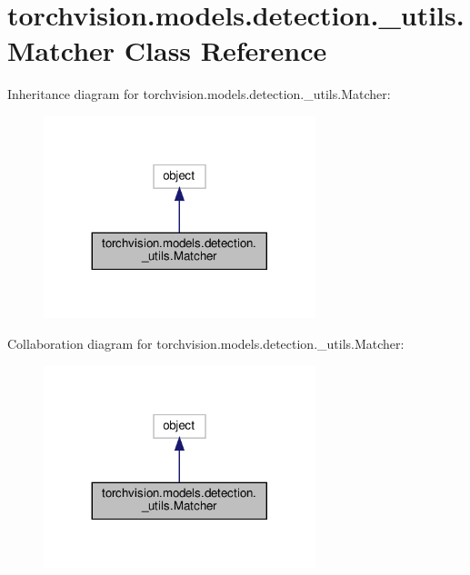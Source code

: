 \hypertarget{classtorchvision_1_1models_1_1detection_1_1__utils_1_1Matcher}{}\section{torchvision.\+models.\+detection.\+\_\+utils.\+Matcher Class Reference}
\label{classtorchvision_1_1models_1_1detection_1_1__utils_1_1Matcher}


Inheritance diagram for torchvision.\+models.\+detection.\+\_\+utils.\+Matcher\+:
\nopagebreak
\begin{figure}[H]
\begin{center}
\leavevmode
\includegraphics[width=224pt]{classtorchvision_1_1models_1_1detection_1_1__utils_1_1Matcher__inherit__graph}
\end{center}
\end{figure}


Collaboration diagram for torchvision.\+models.\+detection.\+\_\+utils.\+Matcher\+:
\nopagebreak
\begin{figure}[H]
\begin{center}
\leavevmode
\includegraphics[width=224pt]{classtorchvision_1_1models_1_1detection_1_1__utils_1_1Matcher__coll__graph}
\end{center}
\end{figure}
